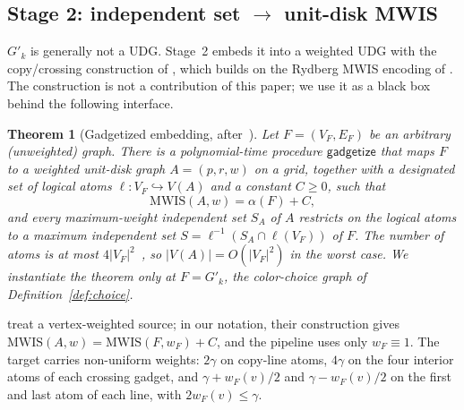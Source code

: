 \documentclass[a4paper,fleqn]{cas-sc}
\newtheorem{theorem}{Theorem}[section]
\newcommand{\MWIS}{\mathrm{MWIS}}
\newcommand{\indep}{\alpha}
\begin{document}
\subsection{\texorpdfstring{Stage 2: independent set $\to$ unit-disk MWIS}{Stage 2: independent set to unit-disk MWIS}}
\label{sec:gadgetize}

$G'_k$ is generally not a UDG. Stage~2 embeds it into a weighted UDG with the
copy/crossing construction of \citet{Nguyen2023}, which builds on the Rydberg MWIS
encoding of \citet{Pichler2018}. The construction is not a contribution of this
paper; we use it as a black box behind the following interface.

\begin{theorem}[Gadgetized embedding, after~\cite{Nguyen2023}]
\label{thm:gadget}
Let $F=(V_F,E_F)$ be an arbitrary (unweighted) graph. There is a
polynomial-time procedure $\mathsf{gadgetize}$ that maps $F$
to a weighted unit-disk graph $A=(p,r,w)$ on a grid, together
with a designated set of \emph{logical} atoms
$\ell:V_F\hookrightarrow V(A)$ and a constant $C\ge 0$, such that
\[
  \MWIS(A,w) = \indep(F) + C,
\]
and every maximum-weight independent set $S_A$ of $A$ restricts on the logical
atoms to a maximum independent set
$S=\ell^{-1}(S_A\cap \ell(V_F))$ of $F$. The number of atoms is at most
$4|V_F|^2$~\cite[Sec.~V\,A]{Nguyen2023}, so $|V(A)| = O\!\left(|V_F|^2\right)$ in the
worst case.
We instantiate the theorem only at $F=G'_k$, the color-choice graph of
Definition~\ref{def:choice}.
\end{theorem}

\citet{Nguyen2023} treat a vertex-weighted source; in our notation, their
construction gives $\MWIS(A,w)=\MWIS(F,w_F)+C$, and the pipeline uses only
$w_F\equiv1$. The target carries non-uniform weights: $2\gamma$ on copy-line atoms,
$4\gamma$ on the four interior atoms of each crossing gadget, and $\gamma+w_F(v)/2$
and $\gamma-w_F(v)/2$ on the first and last atom of each line, with $2w_F(v)\le\gamma$.
\end{document}
